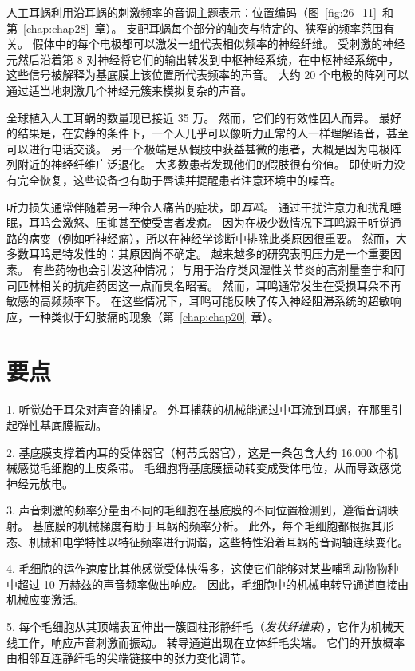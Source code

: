 人工耳蜗利用沿耳蜗的刺激频率的音调主题表示：位置编码（图~\ref{fig:26_11}~和第~\ref{chap:chap28}~章）。
支配耳蜗每个部分的轴突与特定的、狭窄的频率范围有关。
假体中的每个电极都可以激发一组代表相似频率的神经纤维。
受刺激的神经元然后沿着第 8 对神经将它们的输出转发到中枢神经系统，在中枢神经系统中，这些信号被解释为基底膜上该位置所代表频率的声音。
大约 20 个电极的阵列可以通过适当地刺激几个神经元簇来模拟复杂的声音。


全球植入人工耳蜗的数量现已接近 35 万。
然而，它们的有效性因人而异。
最好的结果是，在安静的条件下，一个人几乎可以像听力正常的人一样理解语音，甚至可以进行电话交谈。
另一个极端是从假肢中获益甚微的患者，大概是因为电极阵列附近的神经纤维广泛退化。
大多数患者发现他们的假肢很有价值。
即使听力没有完全恢复，这些设备也有助于唇读并提醒患者注意环境中的噪音。


听力损失通常伴随着另一种令人痛苦的症状，即\textit{耳鸣}。
通过干扰注意力和扰乱睡眠，耳鸣会激怒、压抑甚至使受害者发疯。
因为在极少数情况下耳鸣源于听觉通路的病变（例如听神经瘤），所以在神经学诊断中排除此类原因很重要。
然而，大多数耳鸣是特发性的：其原因尚不确定。
越来越多的研究表明压力是一个重要因素。
有些药物也会引发这种情况；
与用于治疗类风湿性关节炎的高剂量奎宁和阿司匹林相关的抗疟药因这一点而臭名昭著。
然而，耳鸣通常发生在受损耳朵不再敏感的高频频率下。
在这些情况下，耳鸣可能反映了传入神经阻滞系统的超敏响应，一种类似于幻肢痛的现象（第~\ref{chap:chap20}~章）。



\section{要点}

1. 听觉始于耳朵对声音的捕捉。
外耳捕获的机械能通过中耳流到耳蜗，在那里引起弹性基底膜振动。


2. 基底膜支撑着内耳的受体器官（柯蒂氏器官），这是一条包含大约 16,000 个机械感觉毛细胞的上皮条带。
毛细胞将基底膜振动转变成受体电位，从而导致感觉神经元放电。


3. 声音刺激的频率分量由不同的毛细胞在基底膜的不同位置检测到，遵循音调映射。
基底膜的机械梯度有助于耳蜗的频率分析。
此外，每个毛细胞都根据其形态、机械和电学特性以特征频率进行调谐，这些特性沿着耳蜗的音调轴连续变化。 


4. 毛细胞的运作速度比其他感觉受体快得多，这使它们能够对某些哺乳动物物种中超过 10 万赫兹的声音频率做出响应。
因此，毛细胞中的机械电转导通道直接由机械应变激活。 


5. 每个毛细胞从其顶端表面伸出一簇圆柱形静纤毛（\textit{发状纤维束}），它作为机械天线工作，响应声音刺激而振动。
转导通道出现在立体纤毛尖端。
它们的开放概率由相邻互连静纤毛的尖端链接中的张力变化调节。


